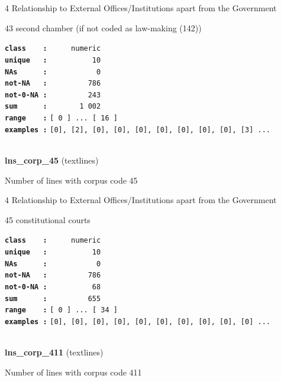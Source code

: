 \documentclass[]{article}
\begin{document}
4 Relationship to External Offices/Institutions apart from the
Government

43 second chamber (if not coded as law-making (142))

\textbf{\texttt{class\ \ \ \ :}} \texttt{~~~~~numeric}\\
\textbf{\texttt{unique\ \ \ :}} \texttt{~~~~~~~~~~10}\\
\textbf{\texttt{NAs\ \ \ \ \ \ :}} \texttt{~~~~~~~~~~~0}\\
\textbf{\texttt{not-NA\ \ \ :}} \texttt{~~~~~~~~~786}\\
\textbf{\texttt{not-0-NA\ :}} \texttt{~~~~~~~~~243}\\
\textbf{\texttt{sum\ \ \ \ \ \ :}} \texttt{~~~~~~~1~002}\\
\textbf{\texttt{range\ \ \ \ :}}
\texttt{{[}\ 0\ {]}\ ...\ {[}\ 16\ {]}}\\
\textbf{\texttt{examples\ :}}
\texttt{{[}0{]},\ {[}2{]},\ {[}0{]},\ {[}0{]},\ {[}0{]},\ {[}0{]},\ {[}0{]},\ {[}0{]},\ {[}0{]},\ {[}3{]}\ ...}\\

~

\textbf{lns\_corp\_45} (textlines)

Number of lines with corpus code 45

4 Relationship to External Offices/Institutions apart from the
Government

45 constitutional courts

\textbf{\texttt{class\ \ \ \ :}} \texttt{~~~~~numeric}\\
\textbf{\texttt{unique\ \ \ :}} \texttt{~~~~~~~~~~10}\\
\textbf{\texttt{NAs\ \ \ \ \ \ :}} \texttt{~~~~~~~~~~~0}\\
\textbf{\texttt{not-NA\ \ \ :}} \texttt{~~~~~~~~~786}\\
\textbf{\texttt{not-0-NA\ :}} \texttt{~~~~~~~~~~68}\\
\textbf{\texttt{sum\ \ \ \ \ \ :}} \texttt{~~~~~~~~~655}\\
\textbf{\texttt{range\ \ \ \ :}}
\texttt{{[}\ 0\ {]}\ ...\ {[}\ 34\ {]}}\\
\textbf{\texttt{examples\ :}}
\texttt{{[}0{]},\ {[}0{]},\ {[}0{]},\ {[}0{]},\ {[}0{]},\ {[}0{]},\ {[}0{]},\ {[}0{]},\ {[}0{]},\ {[}0{]}\ ...}\\

~

\textbf{lns\_corp\_411} (textlines)

Number of lines with corpus code 411
\end{document}
